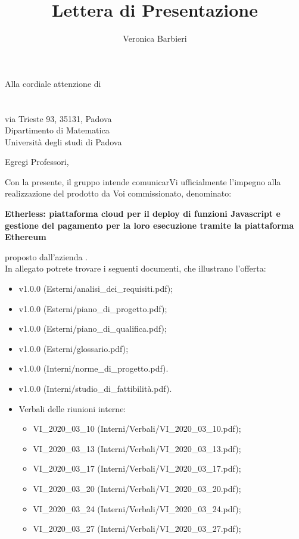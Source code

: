 \documentclass[a4paper]{letter}
\title{Lettera di Presentazione}
\author{Veronica Barbieri}
\begin{document}
\begin{letter} {Alla cordiale attenzione di \\ \TV \\ \RC \\ via Trieste 93, 35131, Padova\\ Dipartimento di Matematica \\ Università degli studi di Padova }
  \vspace*{-0.4\baselineskip}

\opening{Egregi Professori,}
  Con la presente, il gruppo \Gruppo{} intende comunicarVi ufficialmente l'impegno alla realizzazione del prodotto da Voi commissionato, denominato:
  \begin{center}
    \textbf{Etherless: piattaforma cloud per il deploy di funzioni Javascript e gestione del pagamento per la loro esecuzione tramite la piattaforma Ethereum}
  \end{center}
  proposto dall'azienda \Proponente.\\
  In allegato potrete trovare i seguenti documenti, che illustrano l'offerta:
  \begin{itemize}
    \item \AdR{}v1.0.0 (Esterni/analisi\_dei\_requisiti.pdf);
    \item \PdP{}v1.0.0 (Esterni/piano\_di\_progetto.pdf);
    \item \PdQ{}v1.0.0 (Esterni/piano\_di\_qualifica.pdf);
    \item \Glossario{}v1.0.0 (Esterni/glossario.pdf);
    \item \NdP{}v1.0.0 (Interni/norme\_di\_progetto.pdf).
    \item \SdF{}v1.0.0 (Interni/studio\_di\_fattibilità.pdf).
    \item Verbali delle riunioni interne:
      \begin{itemize}
        \item VI\_2020\_03\_10 (Interni/Verbali/VI\_2020\_03\_10.pdf);
        \item VI\_2020\_03\_13 (Interni/Verbali/VI\_2020\_03\_13.pdf);
        \item VI\_2020\_03\_17 (Interni/Verbali/VI\_2020\_03\_17.pdf);
        \item VI\_2020\_03\_20 (Interni/Verbali/VI\_2020\_03\_20.pdf);
        \item VI\_2020\_03\_24 (Interni/Verbali/VI\_2020\_03\_24.pdf);
        \item VI\_2020\_03\_27 (Interni/Verbali/VI\_2020\_03\_27.pdf);

\end{itemize}
\end{itemize}
\end{letter}
\end{document}
